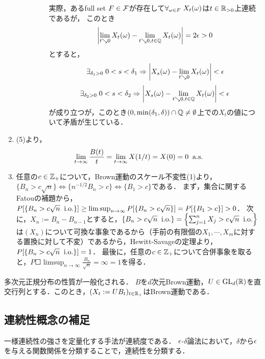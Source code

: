 \documentclass[uplatex,dvipdfmx]{jsreport}
\begin{document}
\begin{Proof}
\begin{enumerate}
\begin{description}
\begin{enumerate}[(a)]
                実際，あるfull set $F\in\mathcal{F}$が存在して$\forall_{\omega\in F}\;X_t(\omega)$は$t\in\mathbb{R}_{>0}$上連続であるが，
                このとき\[\left|\lim_{t\searrow0}X_t(\omega)-\lim_{t\searrow 0,t\in\mathbb{Q}}X_t(\omega)\right|=2\epsilon>0\]とすると，
                \[\exists_{\delta_1>0}\;0<s<\delta_1\Rightarrow\left|X_s(\omega)-\lim_{t\searrow0}X_t(\omega)\right|<\epsilon\]
                \[\exists_{\delta_2>0}\;0<s<\delta_2\Rightarrow\left|X_s(\omega)-\lim_{t\searrow 0,t\in\mathbb{Q}}X_t(\omega)\right|<\epsilon\]
                が成り立つが，このとき$(0,\min(\delta_1,\delta))\cap\mathbb{Q}\ne\emptyset$上での$X_t$の値について矛盾が生じている．
            \end{enumerate}
        \end{description}
        \item (5)より，
        \[\lim_{t\to\infty}\frac{B(t)}{t}=\lim_{t\to\infty}X(1/t)=X(0)=0\;\;\mathrm{a.s.}\]
        \item 任意の$c\in\mathbb{Z}_+$について，Brown運動のスケール不変性(1)より，$\{B_n>c\sqrt{n}\}\Leftrightarrow\{n^{-1/2}B_n>c\}\Leftrightarrow\{B_1>c\}$である．
        まず，集合に関するFatouの補題から，$P[\left\{B_n>c\sqrt{n}\;\;\mathrm{i.o.}\right\}]\ge\limsup_{n\to\infty}P[\left\{B_n>c\sqrt{n}\right\}]=P[\left\{B_1>c\right\}]>0$．
        次に，$X_n:=B_n-B_{n-1}$とすると，$\left\{B_n>c\sqrt{n}\;\;\mathrm{i.o.}\right\}=\left\{\sum^n_{j=1}X_j>c\sqrt{n}\;\;\mathrm{i.o.}\right\}$は$(X_n)$について可換な事象であるから（手前の有限個の$X_1,\cdots,X_m$に対する置換に対して不変）であるから，Hewitt-Savageの定理より，$P[\left\{B_n>c\sqrt{n}\;\;\mathrm{i.o.}\right\}]=1$．
        最後に，任意の$c\in\mathbb{Z}_+$について合併事象を取ると，$P\Square{\limsup_{n\to\infty}\frac{B_n}{\sqrt{n}}=\infty}=1$を得る．
    \end{enumerate}
\end{Proof}

\begin{proposition}
    多次元正規分布の性質が一般化される．
    $B$を$d$次元Brown運動，$U\in\mathrm{GL}_d(\mathbb{R})$を直交行列とする．このとき，$(X_t:=UB_t)_{t\in\mathbb{R}_+}$はBrown運動である．
\end{proposition}

\subsection{連続性概念の補足}

\begin{tcolorbox}[colframe=ForestGreen, colback=ForestGreen!10!white,breakable,colbacktitle=ForestGreen!40!white,coltitle=black,fonttitle=\bfseries\sffamily,
title=]
    一様連続性の強さを定量化する手法が連続度である．
    $\epsilon$-$\delta$論法において，$\delta$から$\epsilon$を与える関数関係を分類することで，連続性を分類する．
\end{tcolorbox}
\end{document}
